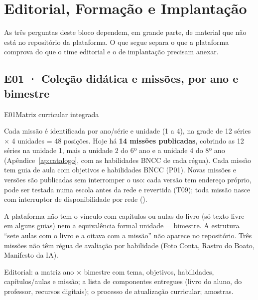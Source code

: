\chapter{Editorial, Formação e Implantação}
\label{cap:editorial}

As três perguntas deste bloco dependem, em grande parte, de material que não
está no repositório da plataforma. O que segue separa o que a plataforma
comprova do que o time editorial e o de implantação precisam anexar.

\section{E01 · Coleção didática e missões, por ano e bimestre}
\label{sec:e01}

\begin{resposta}{E01}{Matriz curricular integrada}{\foradorepo}
\begin{campos}
  \item[Plataforma] Cada missão é identificada por ano/série e unidade (1 a
    4), na grade de 12 séries $\times$ 4 unidades = 48 posições. Hoje há
    \textbf{14 missões publicadas}, cobrindo as 12 séries na unidade 1, mais
    a unidade 2 do 6º ano e a unidade 4 do 8º ano (Apêndice~\ref{ap:catalogo},
    com as habilidades BNCC de cada régua). Cada missão tem guia de aula com
    objetivos e habilidades BNCC (P01). Novas missões e versões são
    publicadas sem interromper o uso: cada versão tem endereço próprio,
    pode ser testada numa escola antes da rede e revertida (T09); toda
    missão nasce com interruptor de disponibilidade por rede
    ().
  \item[Limitações] A plataforma não tem o vínculo com capítulos ou aulas do
    livro (só texto livre em alguns guias) nem a equivalência formal unidade
    = bimestre. A estrutura ``sete aulas com o livro e a oitava com a
    missão'' não aparece no repositório. Três missões não têm régua de
    avaliação por habilidade (Foto Conta, Rastro do Boato, Manifesto da IA).
  \item[Lacuna] Editorial: a matriz ano $\times$ bimestre com tema, objetivos,
    habilidades, capítulos/aulas e missão; a lista de componentes entregues
    (livro do aluno, do professor, recursos digitais); o processo de
    atualização curricular; amostras.
\end{campos}
\end{resposta}

